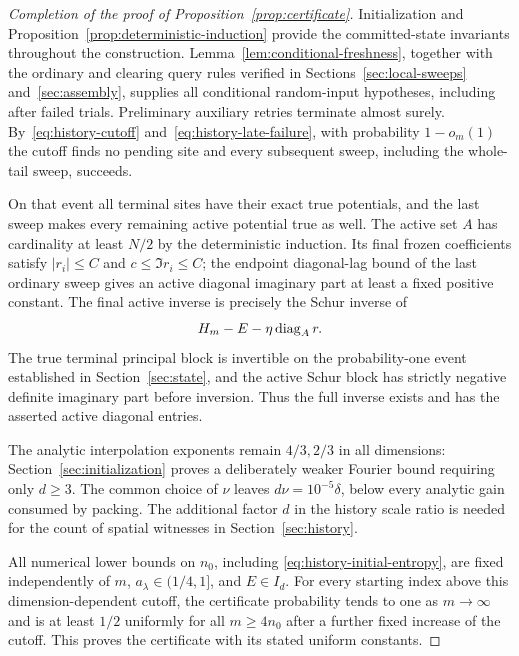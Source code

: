 \begin{proof}[Completion of the proof of Proposition~\ref{prop:certificate}]
Initialization and Proposition~\ref{prop:deterministic-induction} provide
the committed-state invariants throughout the construction.
Lemma~\ref{lem:conditional-freshness}, together with the ordinary and
clearing query rules verified in Sections~\ref{sec:local-sweeps}
and~\ref{sec:assembly}, supplies all conditional random-input hypotheses,
including after failed trials. Preliminary auxiliary retries
terminate almost surely.  By~\eqref{eq:history-cutoff}
and~\eqref{eq:history-late-failure}, with probability $1-o_m(1)$ the
cutoff finds no pending site and every subsequent sweep, including the
whole-tail sweep, succeeds.

On that event all terminal sites have their exact true potentials, and the
last sweep makes every remaining active potential true as well.  The
active set $A$ has cardinality at least $N/2$ by the deterministic
induction.  Its final frozen coefficients satisfy
$|r_i|\le C$ and $c\le\Im r_i\le C$; the endpoint diagonal-lag bound
of the last ordinary sweep gives an active diagonal imaginary part at
least a fixed positive constant.  The final active inverse is precisely
the Schur inverse of
\[
 H_m-E-\eta\operatorname{diag}_A r.
\]
The true terminal principal block is invertible on the probability-one
event established in Section~\ref{sec:state}, and the active Schur block has strictly
negative definite imaginary part before inversion.  Thus the full inverse
exists and has the asserted active diagonal entries.

The analytic interpolation exponents remain $4/3,2/3$ in all dimensions:
Section~\ref{sec:initialization} proves a deliberately weaker Fourier
bound requiring only $d\ge3$. The common choice of $\nu$ leaves
$d\nu=10^{-5}\delta$, below every analytic gain consumed by packing.
The additional factor $d$ in the history scale ratio is needed for
the count of spatial witnesses in Section~\ref{sec:history}.

All numerical lower bounds on $n_0$, including
\eqref{eq:history-initial-entropy}, are fixed independently of $m$,
$a_\lambda\in(1/4,1]$, and $E\in I_d$. For every starting index above
this dimension-dependent cutoff, the certificate probability tends to
one as $m\to\infty$ and is at least $1/2$ uniformly for all
$m\ge4n_0$ after a further fixed increase of the cutoff. This proves
the certificate with its stated uniform constants.
\end{proof}

